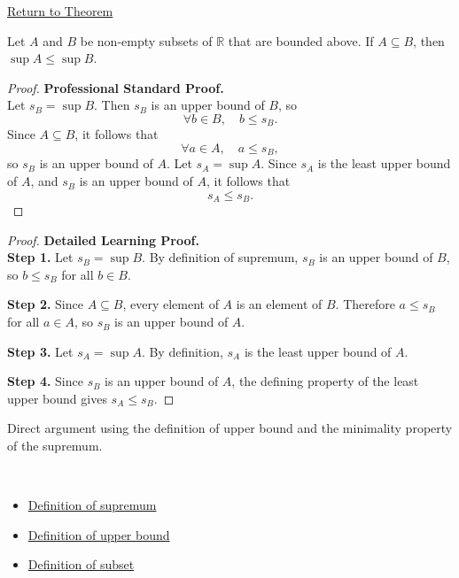 \newpage
{}
\label{prf:supremum-is-monotone-under-inclusion}

\begin{remark*}[Return]
\hyperref[thm:supremum-is-monotone-under-inclusion]{Return to Theorem}
\end{remark*}

\begin{theorem*}
Let $A$ and $B$ be non-empty subsets of $\mathbb{R}$ that are bounded above. If $A \subseteq B$, then $\sup A \le \sup B$.
\end{theorem*}

\begin{proof}
\textbf{Professional Standard Proof.}~\\
Let $s_B = \sup B$. Then $s_B$ is an upper bound of $B$, so
\[
\forall b \in B,\quad b \le s_B.
\]
Since $A \subseteq B$, it follows that
\[
\forall a \in A,\quad a \le s_B,
\]
so $s_B$ is an upper bound of $A$. Let $s_A = \sup A$. Since $s_A$ is the least upper bound of $A$, and $s_B$ is an upper bound of $A$, it follows that
\[
s_A \le s_B.
\]
\end{proof}

\begin{proof}
\textbf{Detailed Learning Proof.}~\\

\textbf{Step 1.} Let $s_B = \sup B$. By definition of supremum, $s_B$ is an upper bound of $B$, so $b \le s_B$ for all $b \in B$.

\textbf{Step 2.} Since $A \subseteq B$, every element of $A$ is an element of $B$. Therefore $a \le s_B$ for all $a \in A$, so $s_B$ is an upper bound of $A$.

\textbf{Step 3.} Let $s_A = \sup A$. By definition, $s_A$ is the least upper bound of $A$.

\textbf{Step 4.} Since $s_B$ is an upper bound of $A$, the defining property of the least upper bound gives $s_A \le s_B$.
\end{proof}

\begin{remark*}
Direct argument using the definition of upper bound and the minimality property of the supremum.
\end{remark*}

\begin{remark*}[Dependencies]~\\
\begin{itemize}
  \item \hyperref[def:supremum]{Definition of supremum}
  \item \hyperref[def:upper-bound]{Definition of upper bound}
  \item \hyperref[def:subset]{Definition of subset}
\end{itemize}
\end{remark*}